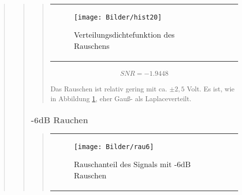 \begin{quote}
\begin{quote}
\begin{quote}
\begin{center}
\begin{tabular}{ll}
\begin{minipage}{0.6\textwidth}
            \end{minipage}
        
            \begin{minipage}{0.6\textwidth}
                \begin{figure}[H]
                    \texttt{[image: Bilder/hist20]}
                    \caption{Verteilungsdichtefunktion des Rauschens}
                    \label{fig:hist20}
                \end{figure}
            
            \end{minipage}
        
        \end{tabular}
        \end{center}
            
            \vspace{2em}
            
            \begin{equation*}
            \begin{split}
                 SNR = -1.9448
            \end{split}
            \end{equation*}
            
            Das Rauschen ist relativ gering mit ca. $ \pm2,5$ Volt. Es ist, wie in Abbildung \ref{fig:hist20}, eher Gauß- als
            Laplaceverteilt.
            
        \end{quote}
        
        
        \subsubsection{-6dB Rauchen}
        \begin{quote}
        \begin{center}
        \begin{tabular}{ll}
        
        \hspace{-16.5em}
            \begin{minipage}{0.6\textwidth}
                
                \begin{figure}[H]
                    \label{fig:funktion0alpha}
                    \texttt{[image: Bilder/rau6]}
                    \caption{Rauschanteil des Signals mit -6dB Rauschen}
                \end{figure}
                

\end{minipage}
\end{tabular}
\end{center}
\end{quote}
\end{quote}
\end{quote}
